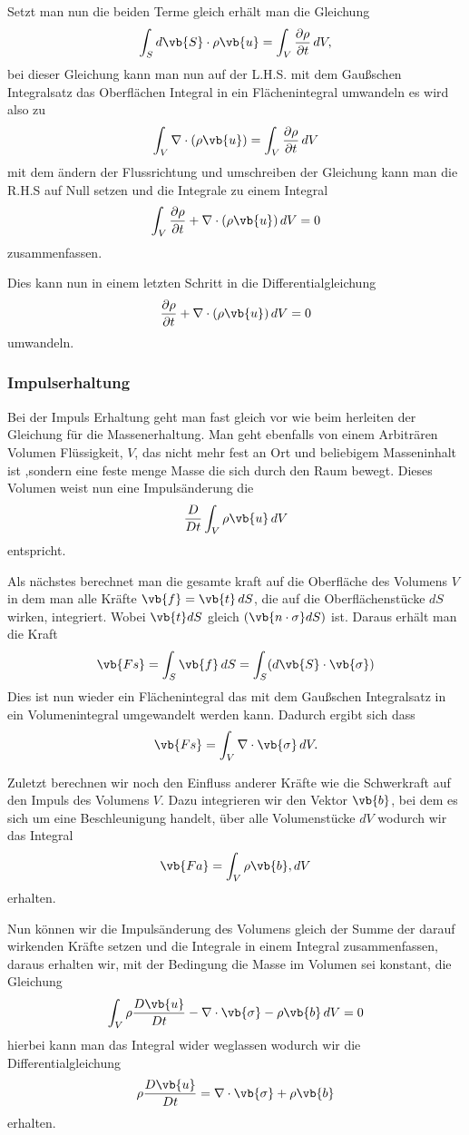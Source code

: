 Setzt man nun die beiden Terme gleich erhält man die Gleichung 
\[\int_{S}d\vb{S}\cdot\rho\vb{u} 
=
\int_{V}\frac{\partial \rho}{\partial t} \, dV ,\] 
bei dieser Gleichung kann man nun auf der L.H.S. mit dem Gaußschen Integralsatz das Oberflächen Integral in ein Flächenintegral umwandeln es wird also zu
\[\int_{V}\nabla\cdot(\rho\vb{u}) 
=
\int_{V}\frac{\partial \rho}{\partial t} \, dV \]
mit dem ändern der Flussrichtung und umschreiben der Gleichung kann man die R.H.S auf Null setzen und die Integrale zu einem Integral
\[\int_{V}\frac{\partial \rho}{\partial t} + \nabla\cdot(\rho\vb{u})  \, dV 
= 
0\]
zusammenfassen.

Dies kann nun in einem letzten Schritt in die Differentialgleichung
\[\frac{\partial \rho}{\partial t} + \nabla\cdot(\rho\vb{u})  \, dV 
= 
0\] 
umwandeln.

\subsubsection{Impulserhaltung}
Bei der Impuls Erhaltung geht man fast gleich vor wie beim herleiten der Gleichung für die Massenerhaltung.
Man geht ebenfalls von einem Arbiträren Volumen Flüssigkeit, $V$, das nicht mehr fest an Ort und beliebigem Masseninhalt ist ,sondern eine feste menge Masse die sich durch den Raum bewegt.
Dieses Volumen weist nun eine Impulsänderung die 
\[\frac{D}{Dt}\int_{V}\rho\vb{u}\, dV\]
entspricht.

Als nächstes berechnet man die gesamte kraft auf die Oberfläche des Volumens $V$ in dem man alle Kräfte $\vb{f} = \vb{t}\,dS$, die auf die Oberflächenstücke $dS$ wirken, integriert.
Wobei $\vb{t} dS$ gleich $(\vb{n\cdot\sigma}dS)$ ist. 
Daraus erhält man die Kraft 
\[\vb{Fs} 
=
\int_{S}\vb{f}\, dS
= \int_{S} (d\vb{S}\cdot\vb{\sigma})
\]
Dies ist nun wieder ein Flächenintegral das mit dem Gaußschen Integralsatz in ein Volumenintegral umgewandelt werden kann.
Dadurch ergibt sich dass
\[\vb{Fs} 
=
\int_{V}\nabla \cdot \vb{\sigma}\, dV
.\]

Zuletzt berechnen wir noch den Einfluss anderer Kräfte wie die Schwerkraft auf den Impuls des Volumens $V$.
Dazu integrieren wir den Vektor $\vb{b}$, bei dem es sich um eine Beschleunigung handelt, über alle Volumenstücke $dV$ wodurch wir das Integral
\[\vb{Fa} 
=
\int_{V}\rho\vb{b}, dV
\]
erhalten.

Nun können wir die Impulsänderung des Volumens gleich der Summe der darauf wirkenden Kräfte setzen und die Integrale in einem Integral zusammenfassen, daraus erhalten wir, mit der Bedingung die Masse im Volumen sei konstant, die Gleichung 
\[\int_{V} \rho \frac{D\vb{u}}{Dt} - \nabla \cdot \vb{\sigma} -\rho \vb{b}\, dV
=
0
\]
hierbei kann man das Integral wider weglassen wodurch wir die Differentialgleichung
\[\rho \frac{D\vb{u}}{Dt}
= 
\nabla \cdot \vb{\sigma} +\rho \vb{b}
\]
erhalten.

